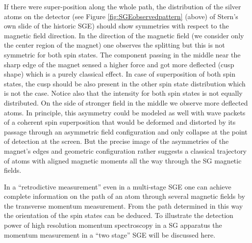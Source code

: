 \documentclass[12pt]{article}
\begin{document}
If there were super-position along the whole path, the distribution of the silver atoms on the detector (see Figure \ref{fig:SGEobservedpattern} (above) of Stern's own slide of the historic SGE) should show symmetries with respect to the magnetic field direction. In the direction of the magnetic field (we consider only the center region of the magnet) one observes the splitting but this is not symmetric for both spin states. The component passing in the middle near the sharp edge of the magnet sensed a higher force and got more deflected (cusp shape) which is a purely classical effect. In case of superposition of both spin states, the cusp should be also present in the other spin state distribution which is not the case. Notice also that the intensity for both spin states is not equally distributed. On the side of stronger field in the middle we observe more deflected atoms. In principle, this asymmetry could be modeled as well with wave packets of a coherent spin superposition that would be deformed and distorted by its passage through an asymmetric field configuration and only collapse at the point of detection at the screen. But the precise image of the asymmetries of the magnet's edges and geometric configuration rather suggests a classical trajectory of atoms with aligned magnetic moments all the way through the SG magnetic fields.

In a ``retrodictive measurement'' even in a multi-stage SGE one can achieve complete information on the path of an atom through several magnetic fields by the transverse momentum measurement. From the path determined in this way the orientation of the spin states can be deduced. To illustrate the detection power of high resolution momentum spectroscopy in a SG apparatus the momentum measurement in a  ``two stage'' SGE will be discussed here. 
\end{document}

